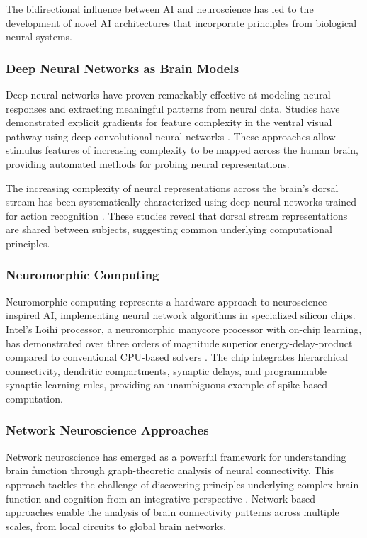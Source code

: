 \documentclass[conference]{IEEEtran}
\begin{document}
The bidirectional influence between AI and neuroscience has led to the development of novel AI architectures that incorporate principles from biological neural systems.

\subsubsection{Deep Neural Networks as Brain Models}

Deep neural networks have proven remarkably effective at modeling neural responses and extracting meaningful patterns from neural data. Studies have demonstrated explicit gradients for feature complexity in the ventral visual pathway using deep convolutional neural networks \citep{gucluDeepNeuralNetworks2015}. These approaches allow stimulus features of increasing complexity to be mapped across the human brain, providing automated methods for probing neural representations.

The increasing complexity of neural representations across the brain's dorsal stream has been systematically characterized using deep neural networks trained for action recognition \citep{gucluDeepNeuralNetworks2015}. These studies reveal that dorsal stream representations are shared between subjects, suggesting common underlying computational principles.

\subsubsection{Neuromorphic Computing}

Neuromorphic computing represents a hardware approach to neuroscience-inspired AI, implementing neural network algorithms in specialized silicon chips. Intel's Loihi processor, a neuromorphic manycore processor with on-chip learning, has demonstrated over three orders of magnitude superior energy-delay-product compared to conventional CPU-based solvers \citep{daviesLoihiNeuromorphicManycore2018}. The chip integrates hierarchical connectivity, dendritic compartments, synaptic delays, and programmable synaptic learning rules, providing an unambiguous example of spike-based computation.

\subsubsection{Network Neuroscience Approaches}

Network neuroscience has emerged as a powerful framework for understanding brain function through graph-theoretic analysis of neural connectivity. This approach tackles the challenge of discovering principles underlying complex brain function and cognition from an integrative perspective \citep{bassettNetworkNeuroscience2017}. Network-based approaches enable the analysis of brain connectivity patterns across multiple scales, from local circuits to global brain networks.
\end{document}
